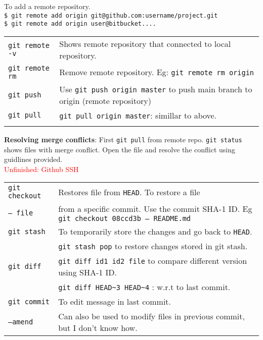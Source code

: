 To add a remote repository.\\
\texttt{\$ git remote add origin git@github.com:username/project.git}\\
\texttt{\$ git remote add origin user@bitbucket....} \\

\begin{tabularx}{\linewidth}{lX}
\texttt{git remote -v} & Shows remote repository that connected to local repository. \\
\texttt{git remote rm} & Remove remote repository. Eg: \texttt{git remote rm origin}\\
\texttt{git push} & Use \texttt{git push origin master} to push main branch to origin (remote repository)\\
\texttt{git pull} & \texttt{git pull origin master}: simillar to above.\\
\hline\\
\end{tabularx}

\textbf{Resolving merge conflicts}: First \texttt{git pull} from remote repo. \texttt{git status} shows files with merge conflict. Open the file and resolve the conflict using guidlines provided. \\

\textcolor{red}{Unfinished: Github SSH}

\begin{tabularx}{\linewidth}{lX}
\texttt{git checkout} & Restores file from \texttt{HEAD}. To restore a file\\
\texttt{-- file} & from a specific commit. Use the commit SHA-1 ID. Eg \texttt{git checkout 08ccd3b -- README.md}\\
\texttt{git stash} & To temporarily store the changes and go back to \texttt{HEAD}.\\
 & \texttt{git stash pop} to restore changes stored in git stash.\\
\texttt{git diff} & \texttt{git diff id1 id2 file} to compare different version using SHA-1 ID.\\
 & \texttt{git diff HEAD\~{}3 HEAD\~{}4} : w.r.t to last commit.\\
\texttt{git commit} & To edit message in last commit.\\
\texttt{--amend} & Can also be used to modify files in previous commit, but I don't know how.\\
\hline
\end{tabularx}

